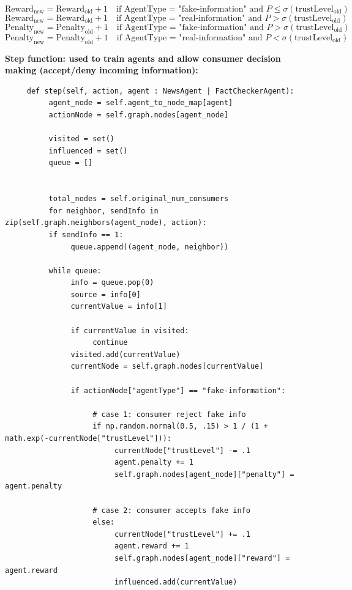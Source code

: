\documentclass[twoside]{article}
\begin{document}
\[
\text{Reward}_{\text{new}} = \text{Reward}_{\text{old}} + 1 \quad \text{if AgentType = "fake-information" and } P \leq \sigma(\text{trustLevel}_{\text{old}})
\]
\[
\text{Reward}_{\text{new}} = \text{Reward}_{\text{old}} + 1 \quad \text{if AgentType = "real-information" and } P > \sigma(\text{trustLevel}_{\text{old}})
\]
\[
\text{Penalty}_{\text{new}} = \text{Penalty}_{\text{old}} + 1 \quad \text{if  AgentType = "fake-information" and } P > \sigma(\text{trustLevel}_{\text{old}})
\]
\[
\text{Penalty}_{\text{new}} = \text{Penalty}_{\text{old}} + 1 \quad \text{if  AgentType = "real-information" and } P < \sigma(\text{trustLevel}_{\text{old}})
\]

\textbf{Step function: used to train agents and allow consumer decision making (accept/deny incoming information):}
\begin{verbatim}
     def step(self, action, agent : NewsAgent | FactCheckerAgent):
          agent_node = self.agent_to_node_map[agent]
          actionNode = self.graph.nodes[agent_node]

          visited = set()
          influenced = set()
          queue = []
          

          total_nodes = self.original_num_consumers
          for neighbor, sendInfo in zip(self.graph.neighbors(agent_node), action):
          if sendInfo == 1:
               queue.append((agent_node, neighbor))

          while queue:
               info = queue.pop(0)
               source = info[0]
               currentValue = info[1]

               if currentValue in visited:
                    continue
               visited.add(currentValue)
               currentNode = self.graph.nodes[currentValue]
               
               if actionNode["agentType"] == "fake-information":

                    # case 1: consumer reject fake info
                    if np.random.normal(0.5, .15) > 1 / (1 + math.exp(-currentNode["trustLevel"])):
                         currentNode["trustLevel"] -= .1
                         agent.penalty += 1
                         self.graph.nodes[agent_node]["penalty"] = agent.penalty

                    # case 2: consumer accepts fake info
                    else:
                         currentNode["trustLevel"] += .1 
                         agent.reward += 1
                         self.graph.nodes[agent_node]["reward"] = agent.reward
                         influenced.add(currentValue)


\end{verbatim}
\end{document}
